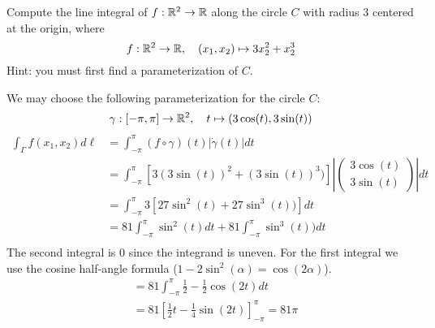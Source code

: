 \documentclass[11pt]{article}
\begin{document}
\begin{exercise}
    Compute the line integral of $f : \mathbb{R}^2 \rightarrow \mathbb{R}$ 
    along the circle $C$ with radius $3$ centered at the origin, where 
    \[
        f : \mathbb{R}^2 \to \mathbb{R}, \quad (x_1,x_2) \mapsto 3 x_2^2 + x_2^3
    \]
    Hint: you must first find a parameterization of $C$. 
\end{exercise}
\begin{solution} 
	We may choose the following parameterization for the circle $C$:
    $$
        \gamma : [-\pi,\pi] \rightarrow \mathbb{R}^2, \quad t \mapsto ( 3\cos(t), 3\sin(t) )
    $$
    \begin{align*}
        \int_{\Gamma} f(x_1,x_2) d\ell &= \int_{-\pi}^{\pi} (f\circ \gamma)(t)|\dot{\gamma}(t)|dt\\
        &=
        \int_{-\pi}^{\pi} \left[3(3\sin(t))^2+(3\sin(t))^3)\right]\left|\begin{pmatrix}3\cos(t)\\3\sin(t)\end{pmatrix}\right| dt\\
        &=
        \int_{-\pi}^{\pi} 3\left[27\sin^2(t)+27\sin^3(t))\right]dt\\
        &=
        81\int_{-\pi}^{\pi} \sin^2(t)dt+ 81\int_{-\pi}^{\pi}\sin^3(t))dt\\
    \end{align*}
    The second integral is $0$ since the integrand is uneven. For the first integral we use the cosine half-angle formula ($1 - 2\sin^2(\alpha) = \cos(2\alpha)$).
    \begin{align*}
        &= 81\int_{-\pi}^{\pi} \frac{1}{2} - \frac{1}{2}\cos(2t)dt\\
        &= 81 \left[ \frac{1}{2} t - \frac{1}{4}\sin(2t) \right]_{-\pi}^{\pi} = 81\pi
    \end{align*}
\end{solution}
\end{document}
